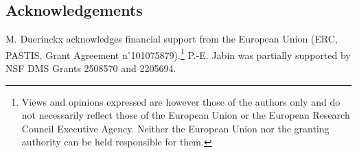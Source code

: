 \documentclass[a4paper,11pt,reqno,noindent]{amsart}
\theoremstyle{plain}
\theoremstyle{definition}
\numberwithin{equation}{section}
\begin{document}
\subsection*{Acknowledgements}
M. Duerinckx acknowledges financial support from the European Union (ERC, PASTIS, Grant Agreement n$^\circ$101075879).\footnote{{Views and opinions expressed are however those of the authors only and do not necessarily reflect those of the European Union or the European Research Council Executive Agency. Neither the European Union nor the granting authority can be held responsible for them.}} P.-E. Jabin was partially supported by NSF DMS Grants 2508570 and 2205694.



\end{document}
